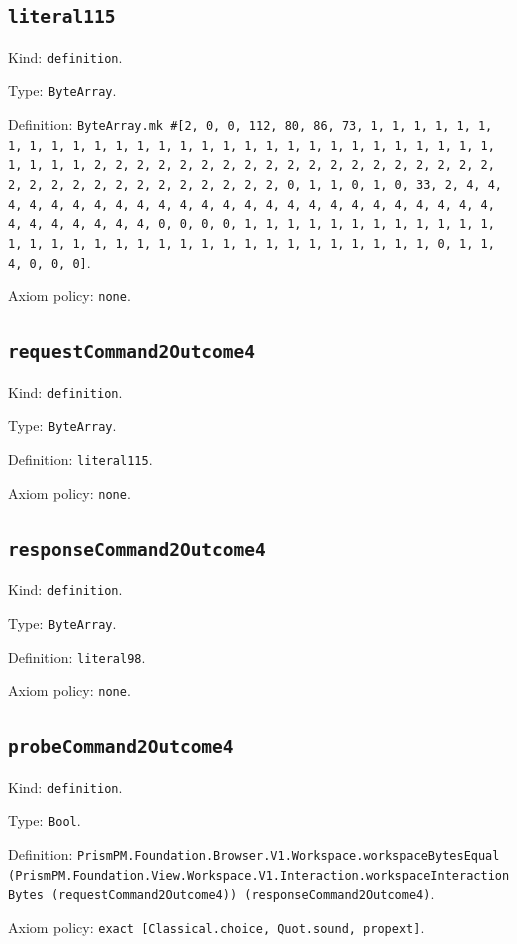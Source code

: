 \documentclass[11pt]{article}
\begin{document}
\subsection*{\texttt{literal115}}
\noindent Kind: \texttt{definition}.\par
\noindent Type: \texttt{ByteArray}.\par
\noindent Definition: \texttt{ByteArray.mk \#[2, 0, 0, 112, 80, 86, 73, 1, 1, 1, 1, 1, 1, 1, 1, 1, 1, 1, 1, 1, 1, 1, 1, 1, 1, 1, 1, 1, 1, 1, 1, 1, 1, 1, 1, 1, 1, 1, 1, 1, 2, 2, 2, 2, 2, 2, 2, 2, 2, 2, 2, 2, 2, 2, 2, 2, 2, 2, 2, 2, 2, 2, 2, 2, 2, 2, 2, 2, 2, 2, 2, 2, 0, 1, 1, 0, 1, 0, 33, 2, 4, 4, 4, 4, 4, 4, 4, 4, 4, 4, 4, 4, 4, 4, 4, 4, 4, 4, 4, 4, 4, 4, 4, 4, 4, 4, 4, 4, 4, 4, 4, 4, 0, 0, 0, 0, 1, 1, 1, 1, 1, 1, 1, 1, 1, 1, 1, 1, 1, 1, 1, 1, 1, 1, 1, 1, 1, 1, 1, 1, 1, 1, 1, 1, 1, 1, 1, 1, 0, 1, 1, 4, 0, 0, 0]}.\par
\noindent Axiom policy: \texttt{none}.\par
\subsection*{\texttt{requestCommand2Outcome4}}
\noindent Kind: \texttt{definition}.\par
\noindent Type: \texttt{ByteArray}.\par
\noindent Definition: \texttt{literal115}.\par
\noindent Axiom policy: \texttt{none}.\par
\subsection*{\texttt{responseCommand2Outcome4}}
\noindent Kind: \texttt{definition}.\par
\noindent Type: \texttt{ByteArray}.\par
\noindent Definition: \texttt{literal98}.\par
\noindent Axiom policy: \texttt{none}.\par
\subsection*{\texttt{probeCommand2Outcome4}}
\noindent Kind: \texttt{definition}.\par
\noindent Type: \texttt{Bool}.\par
\noindent Definition: \texttt{PrismPM.Foundation.Browser.V1.Workspace.workspaceBytesEqual (PrismPM.Foundation.View.Workspace.V1.Interaction.workspaceInteractionBytes (requestCommand2Outcome4)) (responseCommand2Outcome4)}.\par
\noindent Axiom policy: \texttt{exact [Classical.choice, Quot.sound, propext]}.\par
\end{document}
